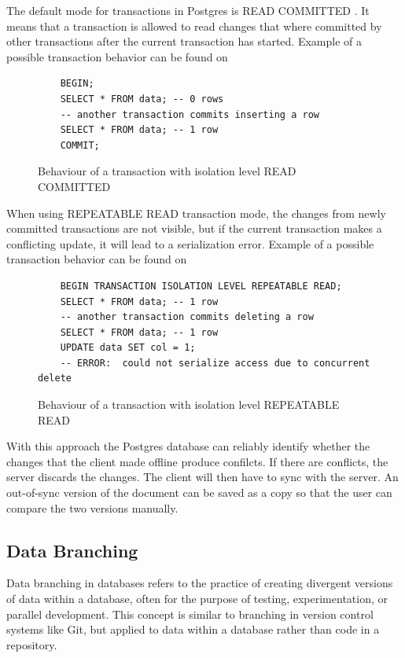 \documentclass[a4paper, 11pt, oneside]{article}
\theoremstyle{definition}
\begin{document}
The default mode for transactions in Postgres is READ COMMITTED \cite{tisolevel}. It means that a transaction is allowed to read changes that where committed by other transactions after the current transaction has started. Example of a possible transaction behavior can be found on 

\begin{figure}[H]
    \centering
    \begin{verbatim}
    BEGIN;
    SELECT * FROM data; -- 0 rows
    -- another transaction commits inserting a row
    SELECT * FROM data; -- 1 row
    COMMIT;
    \end{verbatim}
    \caption{Behaviour of a transaction with isolation level READ COMMITTED}
    \label{fig:readcomm}
\end{figure}

When using REPEATABLE READ transaction mode, the changes from newly committed transactions are not visible, but if the current transaction makes a conflicting update, it will lead to a serialization error. Example of a possible transaction behavior can be found on 

\begin{figure}[H]
    \centering
    \begin{verbatim}
    BEGIN TRANSACTION ISOLATION LEVEL REPEATABLE READ;
    SELECT * FROM data; -- 1 row
    -- another transaction commits deleting a row
    SELECT * FROM data; -- 1 row
    UPDATE data SET col = 1;
    -- ERROR:  could not serialize access due to concurrent delete
    \end{verbatim}
    \caption{Behaviour of a transaction with isolation level REPEATABLE READ}
    \label{fig:repread}
\end{figure}

With this approach the Postgres database can reliably identify whether the changes that the client made offline produce confilcts. If there are conflicts, the server discards the changes. The client will then have to sync with the server. An out-of-sync version of the document can be saved as a copy so that the user can compare the two versions manually.

\subsection{Data Branching}

Data branching in databases refers to the practice of creating divergent versions of data within a database, often for the purpose of testing, experimentation, or parallel development. This concept is similar to branching in version control systems like Git, but applied to data within a database rather than code in a repository.
\end{document}
